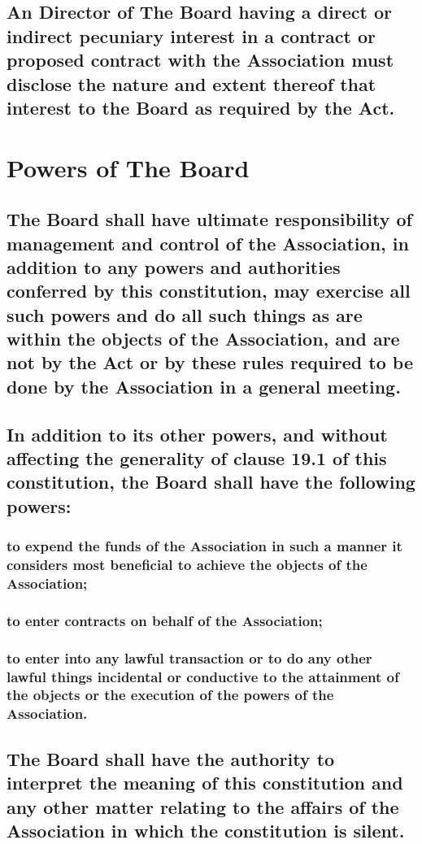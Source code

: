 \documentclass{article}
\newenvironment{subs}
  {\adjustwidth{2em}{0pt}}
  {\endadjustwidth}
\begin{document}
\begin{subs}
\begin{subs}
\begin{subs}
\subsection{An Director of The Board having a direct or indirect pecuniary interest in a contract or proposed contract with the Association must disclose the nature and extent thereof that interest to the Board as required by the Act.}
\end{subs}

\section{Powers of The Board}
\begin{subs}
\subsection{The Board shall have ultimate responsibility of management and control of the Association, in addition to any powers and authorities conferred by this constitution, may exercise all such powers and do all such things as are within the objects of the Association, and are not by the Act or by these rules required to be done by the Association in a general meeting.}
\subsection{In addition to its other powers, and without affecting the generality of clause 19.1 of this constitution, the Board shall have the following powers:}
\begin{subs}
\subsubsection{to expend the funds of the Association in such a manner it considers most beneficial to achieve the objects of the Association;}
\subsubsection{to enter contracts on behalf of the Association;}
\subsubsection{to enter into any lawful transaction or to do any other lawful things incidental or conductive to the attainment of the objects or the execution of the powers of the Association.}
\subsection{The Board shall have the authority to interpret the meaning of this constitution and any other matter relating to the affairs of the Association in which the constitution is silent.}
\end{subs}
\end{subs}


\end{subs}
\end{subs}
\end{document}
